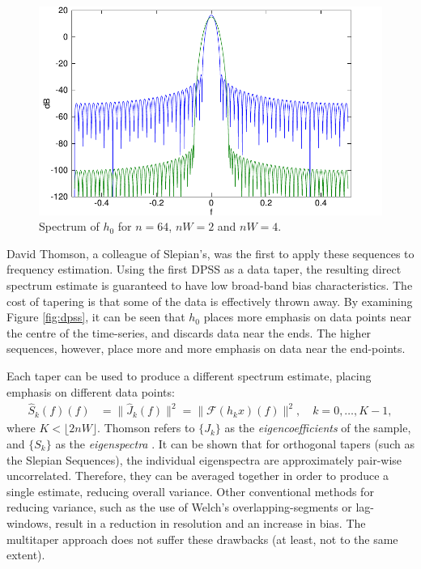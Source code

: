 \begin{figure}
    \centering
    \includegraphics[width=4.75in]{pics/dpss_nw64.pdf}
    \caption[Spectrum of DPSS$_0$]{Spectrum of $h_0$ for $n=64$, \textcolor{blue!80!black}{$nW=2$} and \textcolor{green!40!black}{$nW=4$}. \label{fig:dpssnw}}
\end{figure}

David Thomson, a colleague of Slepian's, was the first to apply these sequences to frequency estimation.  Using the first DPSS as a data taper, the resulting direct spectrum estimate is guaranteed to have low broad-band bias characteristics.  The cost of tapering is that some of the data is effectively thrown away.  By examining Figure \ref{fig:dpss}, it can be seen that $h_0$ places more emphasis on data points near the centre of the time-series, and discards data near the ends.  The higher sequences, however, place more and more emphasis on data near the end-points.  

Each taper can be used to produce a different spectrum estimate, placing emphasis on different data points:
\begin{align}
    \hat{S}_k(f)(f) & = \|\hat{J}_k(f)\|^2 = \|\mathcal{F}(h_kx)(f)\|^2, \quad k=0,\ldots,K-1, \label{eq:eigencoeffs}
\end{align}
where $K<\lfloor2nW\rfloor$.  Thomson refers to $\{J_k\}$ as the \emph{eigencoefficients} of the sample, and $\{S_k\}$ as the \emph{eigenspectra} \cite{thomson:multitaper}.  It can be shown that for orthogonal tapers (such as the Slepian Sequences), the individual eigenspectra are approximately pair-wise uncorrelated.  Therefore, they can be averaged together in order to produce a single estimate, reducing overall variance.  Other conventional methods for reducing variance, such as the use of Welch's overlapping-segments or lag-windows, result in a reduction in resolution and an increase in bias.  The multitaper approach does not suffer these drawbacks (at least, not to the same extent).

